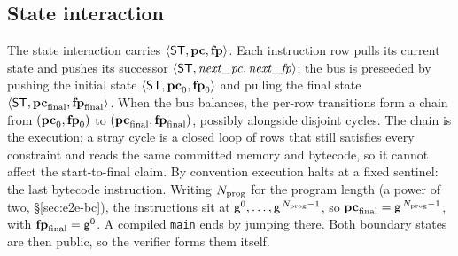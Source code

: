 \subsection{State interaction}\label{sec:state}

The state interaction carries $\langle \mathsf{ST},\mathbf{pc},\mathbf{fp} \rangle$. Each instruction row pulls its current state and pushes its successor $\langle \mathsf{ST},\mathit{next\_pc},\mathit{next\_fp} \rangle$; the bus is preseeded by pushing the initial state $\langle \mathsf{ST},\mathbf{pc}_0,\mathbf{fp}_0 \rangle$ and pulling the final state $\langle \mathsf{ST},\mathbf{pc}_{\mathrm{final}},\mathbf{fp}_{\mathrm{final}} \rangle$. When the bus balances, the per-row transitions form a chain from $(\mathbf{pc}_0,\mathbf{fp}_0)$ to $(\mathbf{pc}_{\mathrm{final}},\mathbf{fp}_{\mathrm{final}})$, possibly alongside disjoint cycles. The chain is the execution; a stray cycle is a closed loop of rows that still satisfies every constraint and reads the same committed memory and bytecode, so it cannot affect the start-to-final claim. By convention execution halts at a fixed sentinel: the last bytecode instruction. Writing $N_{\mathrm{prog}}$ for the program length (a power of two, \S\ref{sec:e2e-bc}), the instructions sit at $\mathsf{g}^{0},\dots,\mathsf{g}^{\,N_{\mathrm{prog}}-1}$, so $\mathbf{pc}_{\mathrm{final}}=\mathsf{g}^{\,N_{\mathrm{prog}}-1}$, with $\mathbf{fp}_{\mathrm{final}}=\mathsf{g}^{0}$. A compiled \texttt{main} ends by jumping there. Both boundary states are then public, so the verifier forms them itself.
